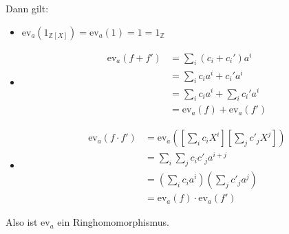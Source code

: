 \documentclass{article}
\newcommand{\Z}{\mathbb{Z}}
\newcommand{\ev}{\text{ev}}
\begin{document}
\begin{enumerate}[(a)]
\begin{equation*}
        \end{equation*}
        Dann gilt:
        \begin{itemize}
            \item
                $\ev_a\left(1_{\Z[X]}\right)=\ev_a(1)=1
                =1_{\Z}$
            \item
                \begin{align*}
                    \ev_a(f+f')
                    &=\sum_i(c_i+c_i')a^i\\
                    &=\sum_i c_ia^i+c_i'a^i\\
                    &=\sum_i c_ia^i+\sum_i c_i'a^i\\
                    &=\ev_a(f)+\ev_a(f')
                \end{align*}
            \item
                \begin{align*}
                    \ev_a(f\cdot f') &=\ev_a\left(
                    \left[\sum_i c_iX^i\right]
                    \left[\sum_j c'_jX^j\right]\right)\\
                    &=\sum_i\sum_j c_ic'_j a^{i+j}\\
                    &=\left(\sum_i c_ia^i\right)
                    \left(\sum_j c'_ja^j\right)\\
                    &=\ev_a(f)\cdot\ev_a(f')
                \end{align*}
        \end{itemize}
        Also ist $\ev_a$ ein Ringhomomorphismus.
\end{enumerate}
\end{document}
